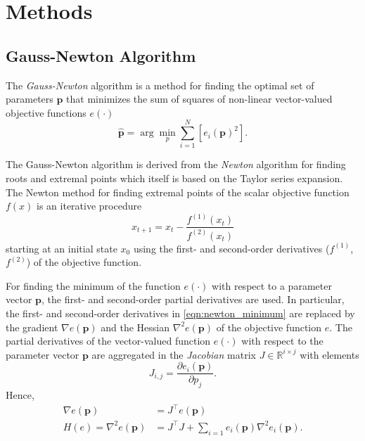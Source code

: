 \chapter{Methods}

\section{Gauss-Newton Algorithm}

The \textit{Gauss-Newton} algorithm is a method for finding the optimal set of parameters $\mathbf{p}$ that minimizes the sum of squares of non-linear vector-valued objective functions $e(\cdot)$
%
\begin{equation}
\hat{\mathbf{p}} = \arg\min_{p} \sum_{i=1}^N\left[ e_i(\mathbf{p})^2\right] .
\end{equation}

The Gauss-Newton algorithm is derived from the \textit{Newton} algorithm for finding roots and extremal points which itself is based on the Taylor series expansion. The Newton method for finding extremal points of the scalar objective function $f(x)$ is an iterative procedure
%
\begin{equation}
x_{t+1} = x_t - \frac{f^{(1)}(x_t)}{f^{(2)}(x_t)}
\label{eqn:newton_minimum}
\end{equation}
%
starting at an initial state $x_0$ using the first- and second-order derivatives ($f^{(1)}$, $f^{(2)}$) of the objective function.

For finding the minimum of the function $e(\cdot)$ with respect to a parameter vector $\mathbf{p}$, the first- and second-order partial derivatives are used. In particular, the first- and second-order derivatives in \ref{eqn:newton_minimum} are replaced by the gradient $\nabla e(\mathbf{p})$ and the Hessian $\nabla^2 e(\mathbf{p})$ of the objective function $e$.
The partial derivatives of the vector-valued function $e(\cdot)$ with respect to the parameter vector $\mathbf{p}$ are aggregated in the \textit{Jacobian} matrix $J\in \mathbb{R}^{i \times j}$ with elements
%
\begin{equation}
J_{i,j} = \frac{\partial e_i(\mathbf{p})}{\partial p_j} .
\end{equation}
%
Hence,
\begin{align}
\nabla e(\mathbf{p}) &= J^\top e(\mathbf{p}) \label{eqn:gn_gradient}\\
H(e) = \nabla^2 e(\mathbf{p}) &= J^\top J +  \sum_{i=1} e_i(\mathbf{p}) \nabla^2 e_i(\mathbf{p}) \label{eqn:gn_hessian_full}.
\end{align}


